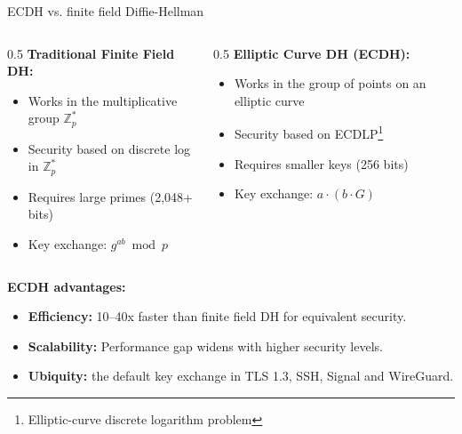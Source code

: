 \ifdefined\PRESENTATION\else\PassOptionsToClass{handout}{beamer}\fi\documentclass[aspectratio=169, lualatex]{beamer}
\begin{document}
\begin{frame}{ECDH vs. finite field Diffie-Hellman}
	\begin{columns}
		\begin{column}{0.5\textwidth}
			\textbf{Traditional Finite Field DH:}
			\begin{itemize}[<+->]
				\item Works in the multiplicative group $\mathbb{Z}_p^*$
				\item Security based on discrete log in $\mathbb{Z}_p^*$
				\item Requires large primes (2,048+ bits)
				\item Key exchange: $g^{ab} \bmod p$
			\end{itemize}
		\end{column}
		\begin{column}{0.5\textwidth}
			\textbf{Elliptic Curve DH (ECDH):}
			\begin{itemize}[<+->]
				\item Works in the group of points on an elliptic curve
				\item Security based on ECDLP\footnote{Elliptic-curve discrete logarithm problem}
				\item Requires smaller keys (256 bits)
				\item Key exchange: $a \cdot (b \cdot G)$
			\end{itemize}
		\end{column}
	\end{columns}
	\vspace{0.5cm}
	\textbf{ECDH advantages:}
	\begin{itemize}[<+->]
		\item \textbf{Efficiency:} 10--40x faster than finite field DH for equivalent security.
		\item \textbf{Scalability:} Performance gap widens with higher security levels.
		\item \textbf{Ubiquity:} the default key exchange in TLS 1.3, SSH, Signal and WireGuard.
	\end{itemize}
\end{frame}
\end{document}
